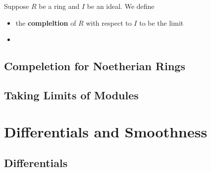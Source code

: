 \documentclass[Total.tex]{subfiles}
\begin{document}
		\begin{Def} Suppose $R$ be a ring and $I$ be an ideal. We define 
			\begin{itemize}
				\item the \textbf{compleltion} of $R$ with respect to $I$ to be the limit
				\item 
			\end{itemize}
		\end{Def}
		
		\section{Compeletion for Noetherian Rings}
		
		\section{Taking Limits of Modules}
	\chapter{Differentials and Smoothness}
	
		\section{Differentials}
\end{document}
